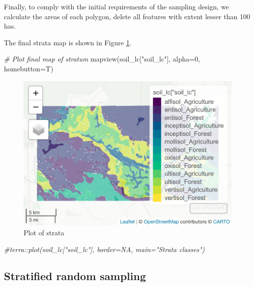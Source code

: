 \documentclass[
]{book}
\newenvironment{Shaded}{\begin{snugshade}}{\end{snugshade}}
\newcommand{\AttributeTok}[1]{\textcolor[rgb]{0.77,0.63,0.00}{#1}}
\newcommand{\CommentTok}[1]{\textcolor[rgb]{0.56,0.35,0.01}{\textit{#1}}}
\newcommand{\DecValTok}[1]{\textcolor[rgb]{0.00,0.00,0.81}{#1}}
\newcommand{\FunctionTok}[1]{\textcolor[rgb]{0.00,0.00,0.00}{#1}}
\newcommand{\NormalTok}[1]{#1}
\newcommand{\StringTok}[1]{\textcolor[rgb]{0.31,0.60,0.02}{#1}}
\begin{document}
Finally, to comply with the initial requirements of the sampling design, we calculate the areas of each polygon, delete all features with extent lesser than 100 has.

The final strata map is shown in Figure \ref{fig:fig-10}.

\begin{Shaded}
\begin{Highlighting}[]
   \CommentTok{\# Plot final map of stratum}
  \FunctionTok{mapview}\NormalTok{(soil\_lc[}\StringTok{"soil\_lc"}\NormalTok{], }\AttributeTok{alpha=}\DecValTok{0}\NormalTok{, }\AttributeTok{homebutton=}\NormalTok{T)}
\end{Highlighting}
\end{Shaded}

\begin{figure}
\centering
\includegraphics{Technical-Manual-Soil-Sampling-Design_files/figure-latex/fig-10-1.pdf}
\caption{\label{fig:fig-10}Plot of strata}
\end{figure}

\begin{Shaded}
\begin{Highlighting}[]
  \CommentTok{\#terra::plot(soil\_lc["soil\_lc"], border=NA, main="Strata classes")}
\end{Highlighting}
\end{Shaded}

\hypertarget{stratified-random-sampling}{%
\subsection{Stratified random sampling}\label{stratified-random-sampling}}
\end{document}
